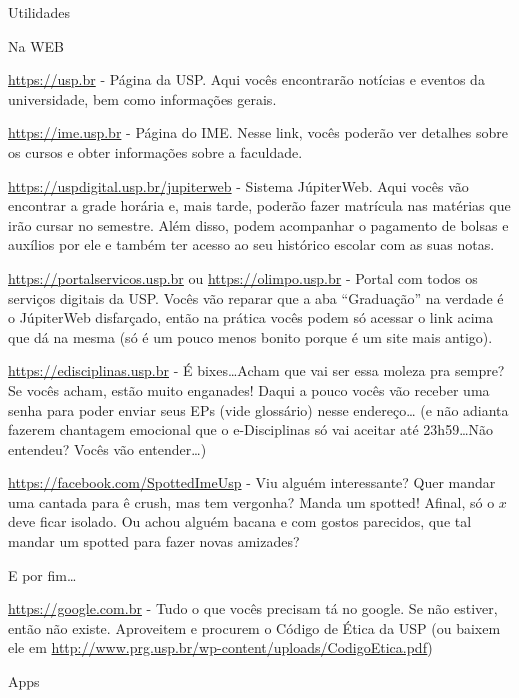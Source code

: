 \begin{secao}{Utilidades}

\begin{subsecao}{Na WEB}

\url{https://usp.br} - Página da USP. Aqui vocês encontrarão notícias e eventos da
universidade, bem como informações gerais.

\url{https://ime.usp.br} - Página do IME. Nesse link, vocês poderão ver detalhes sobre
os cursos e obter informações sobre a faculdade.

\url{https://uspdigital.usp.br/jupiterweb} - Sistema JúpiterWeb. Aqui vocês vão
encontrar a grade horária e, mais tarde, poderão fazer matrícula nas matérias
que irão cursar no semestre. Além disso, podem acompanhar o pagamento de
bolsas e auxílios por ele e também ter acesso ao seu histórico escolar com
as suas notas.

\url{https://portalservicos.usp.br} ou \url{https://olimpo.usp.br} - Portal com todos os
serviços digitais da USP. Vocês vão reparar que a aba ``Graduação'' na verdade
é o JúpiterWeb disfarçado, então na prática vocês podem só acessar o link acima
que dá na mesma (só é um pouco menos bonito porque é um site mais antigo).

\url{https://edisciplinas.usp.br} - É bixes\dots Acham que vai ser essa moleza pra
sempre? Se vocês acham, estão muito enganades! Daqui a pouco vocês vão receber
uma senha para poder enviar seus EPs (vide glossário) nesse endereço\dots
(e não adianta fazerem chantagem emocional que o e-Disciplinas só vai aceitar
até 23h59\dots Não entendeu? Vocês vão entender\dots)

\url{https://facebook.com/SpottedImeUsp} - Viu alguém interessante? Quer mandar uma
cantada para ê crush, mas tem vergonha? Manda um spotted! Afinal, só o $x$ deve
ficar isolado. Ou achou alguém bacana e com gostos parecidos, que tal mandar um
spotted para fazer novas amizades?


E por fim\dots

\url{https://google.com.br} - Tudo o que vocês precisam tá no google. Se não
estiver, então não existe. Aproveitem e procurem o Código de Ética da USP (ou
baixem ele em \url{http://www.prg.usp.br/wp-content/uploads/CodigoEtica.pdf})

\end{subsecao}

\begin{subsecao}{Apps}
	

\end{subsecao}
\end{secao}
